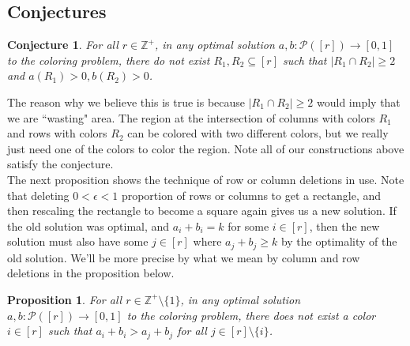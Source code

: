 \documentclass{article}
\newtheorem{proposition}{Proposition}
\newtheorem{conjecture}{Conjecture}
\begin{document}
\begin{center}
\section{Conjectures}
\end{center}
\begin{conjecture}
For all $r \in \mathbb{Z}^{+}$, in any optimal solution $a,b : \mathcal{P}([r]) \rightarrow [0,1]$ to the coloring problem, there do not exist $R_1,R_2 \subseteq [r]$ such that $|R_1 \cap R_2| \geq 2$ and $a(R_1) > 0, b(R_2) > 0$. 
\end{conjecture}

The reason why we believe this is true is because $|R_1 \cap R_2| \geq 2$ would imply that we are ``wasting" area. The region at the intersection of columns with colors $R_1$ and rows with colors $R_2$ can be colored with two different colors, but we really just need one of the colors to color the region. Note all of our constructions above satisfy the conjecture. \\

The next proposition shows the technique of row or column deletions in use. Note that deleting $0 < \epsilon < 1$ proportion of rows or columns to get a rectangle, and then rescaling the rectangle to become a square again gives us a new solution. If the old solution was optimal, and $a_i + b_i = k$ for some $i \in [r]$, then the new solution must also have some $j \in [r]$ where $a_j+b_j \geq k$ by the optimality of the old solution. We'll be more precise by what we mean by column and row deletions in the proposition below. 

\begin{proposition}
For all $r \in \mathbb{Z}^{+} \setminus \{1\}$, in any optimal solution $a,b : \mathcal{P}([r]) \rightarrow [0,1]$ to the coloring problem, there does not exist a color $i \in [r]$ such that $a_i+b_i > a_j+b_j$ for all $j \in [r] \setminus \{i\}$. 
\end{proposition}
\end{document}
